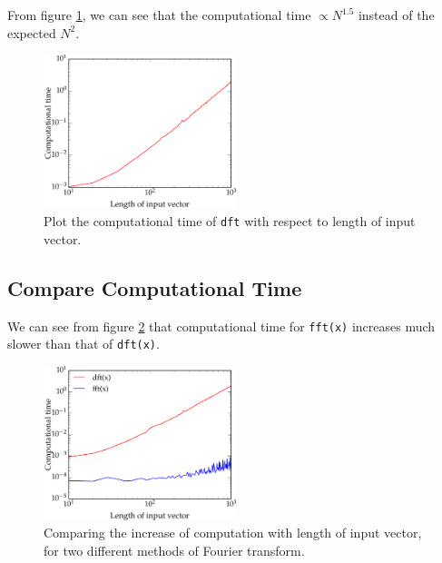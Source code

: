 \documentclass[11pt,letterpaper]{article}
\begin{document}
From figure \ref{fig:TimeTaken}, we can see that the computational time $\propto N^{1.5}$ instead of the expected $N^2$.

\begin{figure}[h!]
	\centering
	\includegraphics[width=0.5\textwidth]{TimeTaken}
	\caption{Plot the computational time of \texttt{dft} with respect to length of input vector.}
	\label{fig:TimeTaken}
\end{figure}

\subsection{Compare Computational Time}

We can see from figure \ref{fig:CompareTime} that computational time for \texttt{fft(x)} increases much slower than that of \texttt{dft(x)}.

\begin{figure}[h!]
	\centering
	\includegraphics[width=0.5\textwidth]{CompareTime}
	\caption{Comparing the increase of computation with length of input vector, for two different methods of Fourier transform.}
	\label{fig:CompareTime}
\end{figure}
\end{document}
